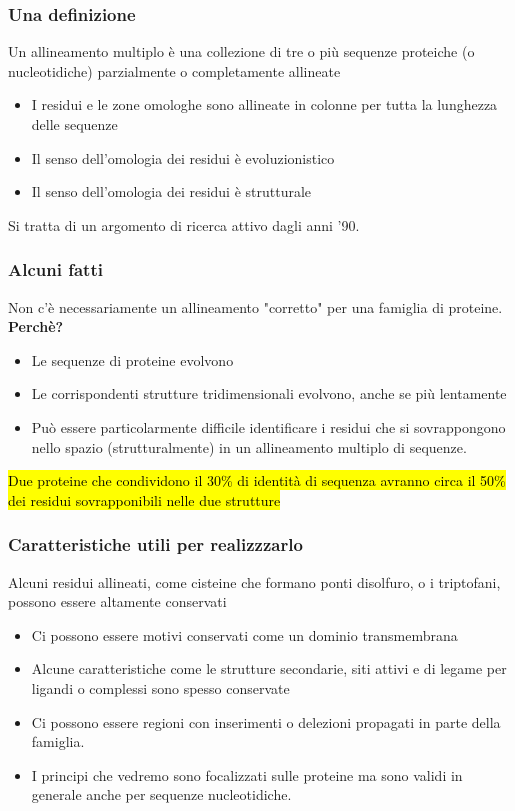 \documentclass{article}
\begin{document}
\subsubsection{Una definizione}
Un allineamento multiplo è una collezione di tre o più sequenze proteiche (o nucleotidiche) parzialmente o completamente allineate
\begin{itemize}
    \item I residui e le zone omologhe sono allineate in colonne per tutta la lunghezza delle sequenze
    \item Il senso dell’omologia dei residui è evoluzionistico
    \item Il senso dell’omologia dei residui è strutturale
\end{itemize}
Si tratta di un argomento di ricerca attivo dagli anni '90.
\subsubsection{Alcuni fatti}
Non c'è necessariamente un allineamento "corretto" per una famiglia di proteine.\\
\textbf{Perchè?}
    \begin{itemize}
        \item Le sequenze di proteine evolvono
        \item Le corrispondenti strutture tridimensionali evolvono, anche se più lentamente
        \item Può essere particolarmente difficile identificare i residui che si sovrappongono nello spazio (strutturalmente) in un allineamento multiplo di sequenze.
    \end{itemize}
\hl{Due proteine che condividono il 30\% di identità di sequenza avranno circa il 50\% dei residui sovrapponibili nelle due strutture}
\subsubsection{Caratteristiche utili per realizzzarlo}
Alcuni residui allineati, come cisteine che formano ponti disolfuro, o i triptofani, possono essere altamente conservati
    \begin{itemize}
        \item Ci possono essere motivi conservati come un dominio transmembrana
        \item Alcune caratteristiche come le strutture secondarie, siti attivi e di legame per ligandi o complessi sono spesso conservate
        \item Ci possono essere regioni con inserimenti o delezioni propagati in parte della famiglia.
        \item I principi che vedremo sono focalizzati sulle proteine ma sono validi in generale anche per sequenze nucleotidiche.
    \end{itemize}
\end{document}
